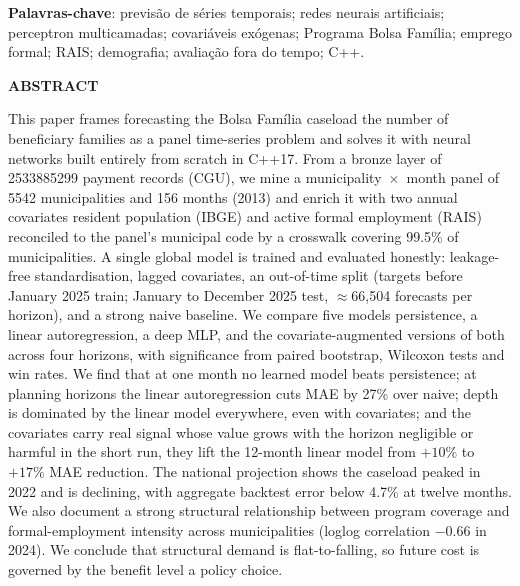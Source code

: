 \documentclass[12pt,a4paper,oneside]{article}
\begin{document}
\medskip

\noindent\textbf{Palavras-chave}: previsão de séries temporais; redes
neurais artificiais; perceptron multicamadas; covariáveis exógenas;
Programa Bolsa Família; emprego formal; RAIS; demografia; avaliação fora
do tempo; C++.

\bigskip

\begin{center}
{\bfseries ABSTRACT}
\end{center}

\noindent
This paper frames forecasting the Bolsa Família caseload \textemdash{}
the number of beneficiary families \textemdash{} as a panel time-series
problem and solves it with neural networks built entirely from scratch in
C++17. From a bronze layer of \num{2533885299} payment records (CGU), we
mine a municipality~$\times$~month panel of \num{5542} municipalities and
156 months (2013) and enrich it with two annual
covariates \textemdash{} resident population (IBGE) and active formal
employment (RAIS) \textemdash{} reconciled to the panel's municipal code
by a crosswalk covering 99.5\% of municipalities. A single global model is
trained and evaluated honestly: leakage-free standardisation, lagged
covariates, an out-of-time split (targets before January 2025 train;
January to December 2025 test, $\approx$66{,}504 forecasts per horizon),
and a strong naive baseline. We compare five models \textemdash{}
persistence, a linear autoregression, a deep MLP, and the
covariate-augmented versions of both \textemdash{} across four horizons,
with significance from paired bootstrap, Wilcoxon tests and win rates. We
find that at one month no learned model beats persistence; at planning
horizons the linear autoregression cuts MAE by 27\% over naive; depth is
dominated by the linear model everywhere, even with covariates; and the
covariates carry real signal whose value grows with the horizon \textemdash{}
negligible or harmful in the short run, they lift the 12-month linear model
from $+10\%$ to $+17\%$ MAE reduction. The national projection shows the
caseload peaked in 2022 and is declining, with aggregate
backtest error below 4.7\% at twelve months. We also document a strong
structural relationship between program coverage and formal-employment
intensity across municipalities (log\-log correlation $-0.66$ in 2024). We
conclude that structural demand is flat-to-falling, so future cost is
governed by the benefit level \textemdash{} a policy choice.

\medskip
\end{document}
